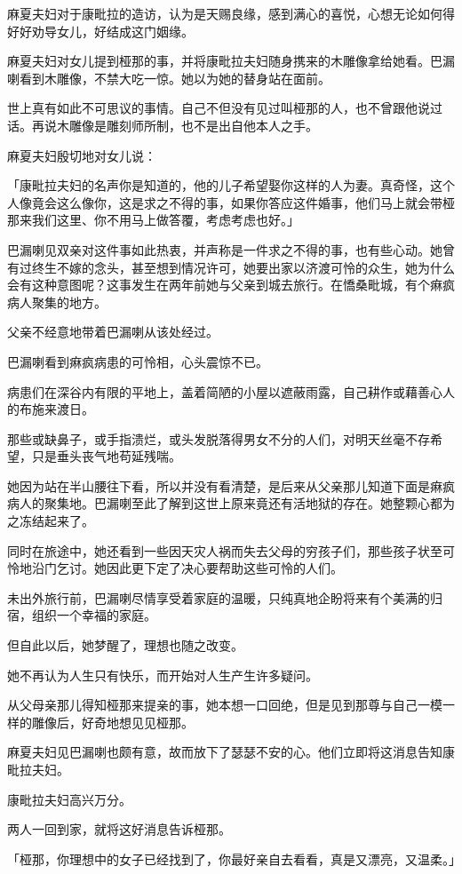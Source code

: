\documentclass[twoside,openany]{book}
\begin{document}
麻夏夫妇对于康毗拉的造访，认为是天赐良缘，感到满心的喜悦，心想无论如何得好好劝导女儿，好结成这门姻缘。

麻夏夫妇对女儿提到桠那的事，并将康毗拉夫妇随身携来的木雕像拿给她看。巴漏喇看到木雕像，不禁大吃一惊。她以为她的替身站在面前。

世上真有如此不可思议的事情。自己不但没有见过叫桠那的人，也不曾跟他说过话。再说木雕像是雕刻师所制，也不是出自他本人之手。

麻夏夫妇殷切地对女儿说：

「康毗拉夫妇的名声你是知道的，他的儿子希望娶你这样的人为妻。真奇怪，这个人像竟会这么像你，这是求之不得的事，如果你答应这件婚事，他们马上就会带桠那来我们这里、你不用马上做答覆，考虑考虑也好。」

巴漏喇见双亲对这件事如此热衷，并声称是一件求之不得的事，也有些心动。她曾有过终生不嫁的念头，甚至想到情况许可，她要出家以济渡可怜的众生，她为什么会有这种意图呢？这事发生在两年前她与父亲到城去旅行。在憍桑毗城，有个痳疯病人聚集的地方。

父亲不经意地带着巴漏喇从该处经过。

巴漏喇看到痳疯病患的可怜相，心头震惊不已。

病患们在深谷内有限的平地上，盖着简陋的小屋以遮蔽雨露，自己耕作或藉善心人的布施来渡日。

那些或缺鼻子，或手指溃烂，或头发脱落得男女不分的人们，对明天丝毫不存希望，只是垂头丧气地苟延残喘。

她因为站在半山腰往下看，所以并没有看清楚，是后来从父亲那儿知道下面是痳疯病人的聚集地。巴漏喇至此了解到这世上原来竟还有活地狱的存在。她整颗心都为之冻结起来了。

同时在旅途中，她还看到一些因天灾人祸而失去父母的穷孩子们，那些孩子状至可怜地沿门乞讨。她因此更下定了决心要帮助这些可怜的人们。

未出外旅行前，巴漏喇尽情享受着家庭的温暖，只纯真地企盼将来有个美满的归宿，组织一个幸福的家庭。

但自此以后，她梦醒了，理想也随之改变。

她不再认为人生只有快乐，而开始对人生产生许多疑问。

从父母亲那儿得知桠那来提亲的事，她本想一口回绝，但是见到那尊与自己一模一样的雕像后，好奇地想见见桠那。

麻夏夫妇见巴漏喇也颇有意，故而放下了瑟瑟不安的心。他们立即将这消息告知康毗拉夫妇。

康毗拉夫妇高兴万分。

两人一回到家，就将这好消息告诉桠那。

「桠那，你理想中的女子已经找到了，你最好亲自去看看，真是又漂亮，又温柔。」
\end{document}
